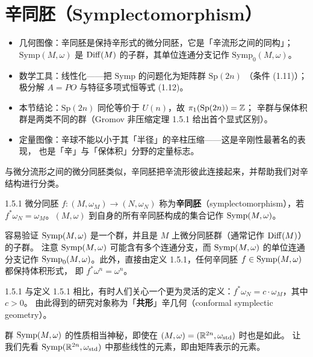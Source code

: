 \section{辛同胚（Symplectomorphism）}

\begin{keytakeaways}
\begin{itemize}
  \item 几何图像：辛同胚是保持辛形式的微分同胚，它是「辛流形之间的同构」；
        $\mathrm{Symp}(M,\omega)$ 是 $\operatorname{Diff}(M)$ 的子群，其单位连通分支记作
        $\mathrm{Symp}_0(M,\omega)$。
  \item 数学工具：线性化——把 $\mathrm{Symp}$ 的问题化为矩阵群 $\mathrm{Sp}(2n)$
        （条件 (1.11)）；极分解 $A=PO$ 与特征多项式恒等式 (1.12)。
  \item 本节结论：$\mathrm{Sp}(2n)$ 同伦等价于 $U(n)$，故 $\pi_1(\mathrm{Sp}(2n))=\mathbb{Z}$；
        辛群与保体积群是两类不同的群（Gromov 非压缩定理 1.5.1 给出首个显式区别）。
  \item 定量图像：辛球不能以小于其「半径」的辛柱压缩——这是辛刚性最著名的表现，
        也是「辛」与「保体积」分野的定量标志。
\end{itemize}
\end{keytakeaways}

与微分流形之间的微分同胚类似，辛同胚把辛流形彼此连接起来，并帮助我们对辛结构进行分类。

\begin{wdefn}{1.5.1}
微分同胚 $f:(M,\omega_M)\to(N,\omega_N)$ 称为\textbf{辛同胚}（symplectomorphism），若
$f^*\omega_N=\omega_M$。$(M,\omega)$ 到自身的所有辛同胚构成的集合记作 $\operatorname{Symp}(M,\omega)$。
\end{wdefn}

容易验证 $\operatorname{Symp}(M,\omega)$ 是一个群，并且是 $M$ 上微分同胚群（通常记作 $\operatorname{Diff}(M)$）的子群。
注意 $\operatorname{Symp}(M,\omega)$ 可能含有多个连通分支，而 $\operatorname{Symp}(M,\omega)$ 的单位连通分支记作
$\operatorname{Symp}_0(M,\omega)$。此外，直接由定义 1.5.1，任何辛同胚 $f\in\operatorname{Symp}(M,\omega)$ 都保持体积形式，
即 $f^*\omega^n=\omega^n$。

\begin{wrem}{1.5.1}
与定义 1.5.1 相比，有时人们关心一个更为灵活的定义：$f^*\omega_N=c\cdot\omega_M$，其中 $c>0$。
由此得到的研究对象称为「\textbf{共形}」辛几何（conformal symplectic geometry）。
\end{wrem}

群 $\operatorname{Symp}(M,\omega)$ 的性质相当神秘，即使在 $(M,\omega)=(\mathbb{R}^{2n},\omega_{\mathrm{std}})$ 时也是如此。
让我们先看 $\operatorname{Symp}(\mathbb{R}^{2n},\omega_{\mathrm{std}})$ 中那些线性的元素，即由矩阵表示的元素。

